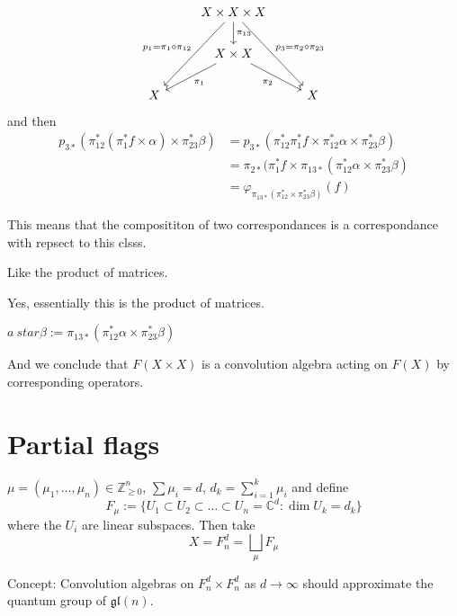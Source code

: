 	 \[\begin{tikzcd}
		&X\times X\times X\arrow[ddl,"p_1=\pi_1\circ \pi_{12}",swap]\arrow[d,"\pi_{13}"]\arrow[ddr,"p_3=\pi_2\circ \pi_{23}"]\\
		& X\times X\arrow[dl,"\pi_1"]\arrow[dr,"\pi_2",swap]\\
		X&&X
	 \end{tikzcd}\]
and then
\begin{align*}
	p_{3*}(\pi_{12}^* (\pi_1^* f\times \alpha)\times \pi_{23}^*\beta)&=p_{3*}(\pi_{12}^*\pi_1^* f\times \pi_{12}^*\alpha\times \pi_{23}^*\beta)\\
	&=\pi_{2*}(\pi_1^* f\times \pi_{13*} (\pi_{12}^*\alpha\times \pi_{23}^*\beta)\\
	&=\varphi_{\pi_{13*}(\pi_{12}^*\times \pi_{23}^*\beta)}(f)
\end{align*}

\begin{thing6}{This means}\leavevmode
	that the composititon of two correspondances is a correspondance with repsect to this clsss.
\end{thing6}

\begin{remark}[Altan]\leavevmode
	Like the product of matrices.
\end{remark}

Yes, essentially this is the product of matrices.

\begin{defn}[Convolution]\leavevmode
	$a\ star  \beta:=\pi_{13*}(\pi_{12}^*\alpha\times \pi_{23}^*\beta)$
\end{defn}
And we conclude that $F(X\times X)$ is a convolution algebra acting on $F(X)$ by corresponding operators.

\section{Partial flags}

$\mu=(\mu_1,\ldots,\mu_n)\in\mathbb{Z}_{\geq 0}^n$, $\sum \mu_i=d$, $d_k=\sum_{i=1}^k\mu_i$
and define
\[F_\mu:=\{U_1\subset U_2\subset\ldots \subset U_n=\mathbb{C}^{d}:\dim U_k=d_k\}\]
where the $U_i$ are linear subspaces. Then take
 \[X=F_n^d=\bigsqcup_\mu F_\mu\]

\begin{thing5}{Concept:}\leavevmode
	Convolution algebras on $F_n^d\times F_n^d$ as $d\to \infty$ should approximate the quantum group of $\mathfrak{gl}(n)$.
\end{thing5}

